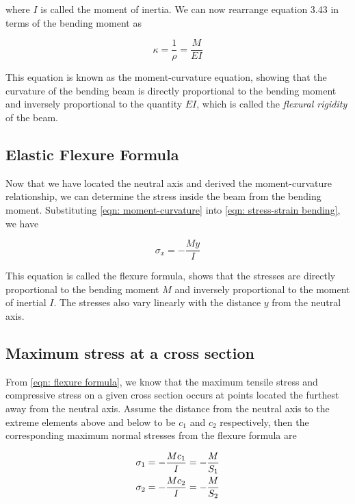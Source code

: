 \documentclass[
10pt,
a4paper,
openany,
svgnames,
]{book} %
\begin{document}
where $I$ is called the moment of inertia. We can now rearrange equation 3.43 in terms of the bending moment as

\begin{equation} \label{eqn: moment-curvature}
  \kappa  = \frac{1}{\rho } = \frac{M}{{EI}}
\end{equation}

This equation is known as the moment-curvature equation, showing that the curvature of the bending beam is directly proportional to the bending moment and inversely proportional to the quantity $EI$, which is called the \emph{flexural rigidity} of the beam.

\subsection{Elastic Flexure Formula}

Now that we have located the neutral axis and derived the moment-curvature relationship, we can determine the stress inside the beam from the bending moment. Substituting \cref{eqn: moment-curvature} into \cref{eqn: stress-strain bending}, we have

\begin{equation} \label{eqn: flexure formula}
  {\sigma _x} =  - \frac{{My}}{I}
\end{equation}

This equation is called the flexure formula, shows that the stresses are directly proportional to the bending moment $M$ and inversely proportional to the moment of inertial $I$. The stresses also vary linearly with the distance $y$ from the neutral axis.

\subsection{Maximum stress at a cross section}

From \cref{eqn: flexure formula}, we know that the maximum tensile stress and compressive stress on a given cross section occurs at points located the furthest away from the neutral axis. Assume the distance from the neutral axis to the extreme elements above and below to be $c_1$ and $c_2$ respectively, then the corresponding maximum normal stresses from the flexure formula are

\begin{equation} \label{eqn: section modulus}
  \begin{gathered}
    {\sigma _1} =  - \frac{{M{c_1}}}{I} =  - \frac{M}{{{S_1}}} \hfill \\
    {\sigma _2} =  - \frac{{M{c_2}}}{I} =  - \frac{M}{{{S_2}}} \hfill \\ 
  \end{gathered}
\end{equation}
\end{document}

